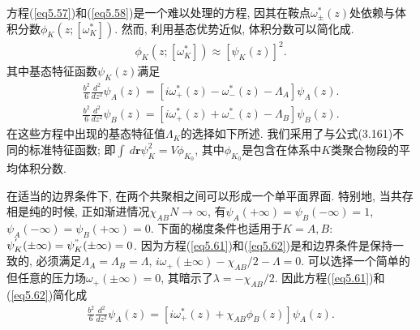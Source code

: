 \par
方程(\ref{eq5.57})和(\ref{eq5.58})是一个难以处理的方程,
因其在鞍点$\omega^{*}_{\pm}(z)$处依赖与体积分数$\phi_{K}(z; [\omega^{*}_{K}])$.
然而, 利用基态优势近似, 体积分数可以简化成.
\label{subsec.equations}
    \begin{equation}
        \begin{aligned}
            \phi_{K}(z; [\omega^{*}_{K}])\approx[\psi_{K}(z)]^2.
        \end{aligned}
        \label{eq5.60}
    \end{equation}
其中基态特征函数$\psi_{K}(z)$满足
\label{subsec.equations}
    \begin{equation}
        \begin{aligned}
        \frac{b^{2}}{6}\frac{d^{2}}{dz^{2}}\psi_{A}(z)=[i\omega^{*}_{+}(z)-\omega^{*}_{-}(z)-\Lambda_{A}]\psi_{A}(z).
        \end{aligned}
        \label{eq5.61}
    \end{equation}
\label{subsec.equations}
    \begin{equation}
        \begin{aligned}
        \frac{b^{2}}{6}\frac{d^{2}}{dz^{2}}\psi_{B}(z)=[i\omega^{*}_{+}(z)+\omega^{*}_{-}(z)-\Lambda_{B}]\psi_{B}(z).
        \end{aligned}
        \label{eq5.62}
    \end{equation}
在这些方程中出现的基态特征值$\Lambda_{K}$的选择如下所述.
我们采用了与公式(3.161)不同的标准特征函数; 即$\int\
d\bm{r}\psi^{2}_{K}=V\phi_{K_{0}}$,
其中$\phi_{K_{0}}$是包含在体系中$K$类聚合物段的平均体积分数.
\par
在适当的边界条件下, 在两个共聚相之间可以形成一个单平面界面. 特别地,
当共存相是纯的时候, 正如渐进情况$\chi_{AB}N\longrightarrow \infty$,
有$\psi_{A}(+\infty)=\psi_{B}(-\infty)=1$,
$\psi_{A}(-\infty)=\psi_{B}(+\infty)=0$. 下面的梯度条件也适用于$K=A, B$:
$\psi^{'}_{K}(\pm\infty)=\psi^{"}_{K}(\pm\infty)=0$.
因为方程(\ref{eq5.61})和(\ref{eq5.62})是和边界条件是保持一致的,
必须满足$\Lambda_{A}=\Lambda_{B}=\Lambda$,
$i\omega_{+}(\pm\infty)-\chi_{AB}/2-\Lambda=0$.
可以选择一个简单的但任意的压力场$\omega_{+}(\pm\infty)=0$,
其暗示了$\lambda=-\chi_{AB}/2$. 因此方程(\ref{eq5.61})和(\ref{eq5.62})简化成
\label{subsec.equations}
    \begin{equation}
        \begin{aligned}
            \frac{b^{2}}{6}\frac{d^{2}}{dz^{2}}\psi_{A}(z)=[i\omega^{*}_{+}(z)+\chi_{AB}\phi_{B}(z)]\psi_{A}(z).
        \end{aligned}
        \label{eq5.63}
    \end{equation}
